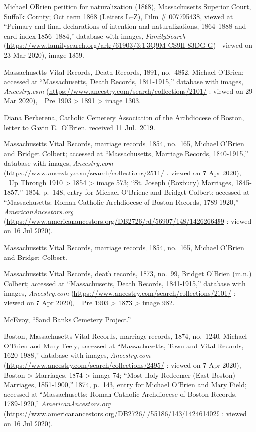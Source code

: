 \begin{thebibliography}{999}

Michael OBrien petition for naturalization (1868), Massachusetts Superior Court, Suffolk County; Oct term 1868 (Letters L--Z), Film \# 007795438, viewed at ``Primary and final declarations of intention and naturalizations, 1864--1888 and card index 1856--1884,'' database with images, \textit{FamilySearch} (\url{https://www.familysearch.org/ark:/61903/3:1:3Q9M-CS9H-83DG-G}) : viewed on 23 Mar 2020), image 1859.

Massachusetts Vital Records, Death Records, 1891, no.\ 4862, Michael O'Brien; accessed at ``Massachusetts, Death Records, 1841-1915,'' database with images, \textit{Ancestry.com} (\url{https://www.ancestry.com/search/collections/2101/} : viewed on 29 Mar 2020), \_Pre 1903 > 1891 > image 1303.

Diana Berberena, Catholic Cemetery Association of the Archdiocese of Boston, letter to Gavin E.\ O'Brien, received 11 Jul.\ 2019.

Massachusetts Vital Records, marriage records, 1854, no.\ 165, Michael O'Brien and Bridget Colbert; accessed at ``Massachusetts, Marriage Records, 1840-1915,'' database with images, \textit{Ancestry.com} (\url{https://www.ancestry.com/search/collections/2511/} : viewed on 7 Apr 2020), \_Up Through 1910 > 1854 > image 573; ``St. Joseph (Roxbury) Marriages, 1845-1857,'' 1854, p.\ 148, entry for Michael O'Briene and Bridget Colbert; accessed at ``Massachusetts: Roman Catholic Archdiocese of Boston Records, 1789-1920,'' \textit{AmericanAncestors.org} (\url{https://www.americanancestors.org/DB2726/rd/56907/148/1426266499} : viewed on 16 Jul 2020).

Massachusetts Vital Records, marriage records, 1854, no.\ 165, Michael O'Brien and Bridget Colbert.

Massachusetts Vital Records, death records, 1873, no.\ 99, Bridget O'Brien (m.n.) Colbert; accessed at ``Massachusetts, Death Records, 1841-1915,'' database with images, \textit{Ancestry.com} (\url{https://www.ancestry.com/search/collections/2101/} : viewed on 7 Apr 2020), \_Pre 1903 > 1873 > image 982.

McEvoy, ``Sand Banks Cemetery Project.'' 

Boston, Massachusetts Vital Records, marriage records, 1874, no.\ 1240, Michael O'Brien and Mary Feely; accessed at ``Massachusetts, Town and Vital Records, 1620-1988,'' database with images, \textit{Ancestry.com} (\url{https://www.ancestry.com/search/collections/2495/} : viewed on 7 Apr 2020), Boston > Marriages, 1874 > image 74; ``Most Holy Redeemer (East Boston) Marriages, 1851-1900,'' 1874, p.\ 143, entry for Michael O'Brien and Mary Field; accessed at ``Massachusetts: Roman Catholic Archdiocese of Boston Records, 1789-1920,'' \textit{AmericanAncestors.org} (\url{https://www.americanancestors.org/DB2726/i/55186/143/1424614029} : viewed on 16 Jul 2020).


\end{thebibliography}
